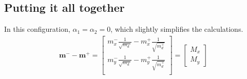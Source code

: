 \documentclass[12pt]{article}
\begin{document}
\subsection{Putting it all together}

In this configuration, $\alpha_1=\alpha_2=0$, which slightly simplifies the calculations.
\begin{align}
    \mathbf{m^-} - \mathbf{m^+} = \begin{bmatrix}
        m_x^-\frac{1}{\sqrt{m_d^-}} - m_x^+\frac{1}{\sqrt{m_d^+}}\\
        m_y^-\frac{1}{\sqrt{m_d^-}} - m_y^+\frac{1}{\sqrt{m_d^+}}\\
    \end{bmatrix}
    = \begin{bmatrix}
        M_x\\M_y
    \end{bmatrix}
\end{align}
\end{document}
